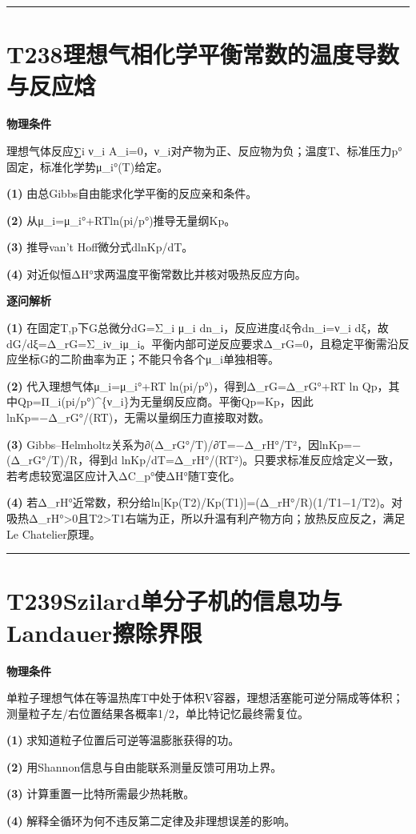 \documentclass[UTF8,a4paper,11pt,oneside,openany]{ctexbook}
\begin{document}
\par\bigskip\hrule\bigskip
\section*{T238\quad 理想气相化学平衡常数的温度导数与反应焓}
\textbf{物理条件}\par 理想气体反应∑i ν\_i A\_i=0，ν\_i对产物为正、反应物为负；温度T、标准压力p°固定，标准化学势μ\_i°(T)给定。
\par\noindent\textbf{(1)} 由总Gibbs自由能求化学平衡的反应亲和条件。
\par\noindent\textbf{(2)} 从μ\_i=μ\_i°+RTln(pi/p°)推导无量纲Kp。
\par\noindent\textbf{(3)} 推导van’t Hoff微分式dlnKp/dT。
\par\noindent\textbf{(4)} 对近似恒ΔH°求两温度平衡常数比并核对吸热反应方向。

\par\medskip\noindent\textbf{逐问解析}
\par\noindent\textbf{(1)} 在固定T,p下G总微分dG=Σ\_i μ\_i dn\_i，反应进度dξ令dn\_i=ν\_i dξ，故dG/dξ=Δ\_rG=Σ\_iν\_iμ\_i。平衡内部可逆反应要求Δ\_rG=0，且稳定平衡需沿反应坐标G的二阶曲率为正；不能只令各个μ\_i单独相等。
\par\noindent\textbf{(2)} 代入理想气体μ\_i=μ\_i°+RT ln(pi/p°)，得到Δ\_rG=Δ\_rG°+RT ln Qp，其中Qp=Π\_i(pi/p°)\textasciicircum{}\{ν\_i\}为无量纲反应商。平衡Qp=Kp，因此lnKp=−Δ\_rG°/(RT)，无需以量纲压力直接取对数。
\par\noindent\textbf{(3)} Gibbs–Helmholtz关系为∂(Δ\_rG°/T)/∂T=−Δ\_rH°/T²，因lnKp=−(Δ\_rG°/T)/R，得到d lnKp/dT=Δ\_rH°/(RT²)。只要求标准反应焓定义一致，若考虑较宽温区应计入ΔC\_p°使ΔH°随T变化。
\par\noindent\textbf{(4)} 若Δ\_rH°近常数，积分给ln[Kp(T2)/Kp(T1)]=(Δ\_rH°/R)(1/T1−1/T2)。对吸热Δ\_rH°>0且T2>T1右端为正，所以升温有利产物方向；放热反应反之，满足Le Chatelier原理。

\par\bigskip\hrule\bigskip
\section*{T239\quad Szilard单分子机的信息功与Landauer擦除界限}
\textbf{物理条件}\par 单粒子理想气体在等温热库T中处于体积V容器，理想活塞能可逆分隔成等体积；测量粒子左/右位置结果各概率1/2，单比特记忆最终需复位。
\par\noindent\textbf{(1)} 求知道粒子位置后可逆等温膨胀获得的功。
\par\noindent\textbf{(2)} 用Shannon信息与自由能联系测量反馈可用功上界。
\par\noindent\textbf{(3)} 计算重置一比特所需最少热耗散。
\par\noindent\textbf{(4)} 解释全循环为何不违反第二定律及非理想误差的影响。
\end{document}
